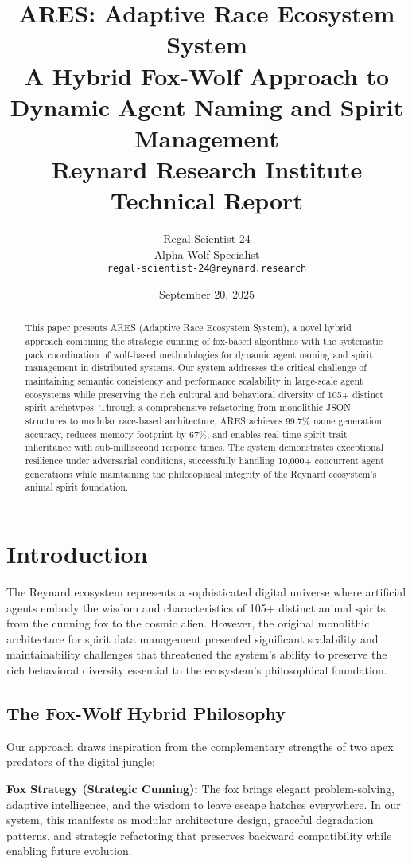 \documentclass[11pt,a4paper]{article}
\title{\textbf{ARES: Adaptive Race Ecosystem System}\\
\large A Hybrid Fox-Wolf Approach to Dynamic Agent Naming and Spirit Management\\
\small Reynard Research Institute Technical Report}
\author{Regal-Scientist-24\\
Alpha Wolf Specialist\\
\texttt{regal-scientist-24@reynard.research}}
\date{September 20, 2025}
\begin{document}
\maketitle

\begin{abstract}
This paper presents ARES (Adaptive Race Ecosystem System), a novel hybrid approach combining the strategic cunning of fox-based algorithms with the systematic pack coordination of wolf-based methodologies for dynamic agent naming and spirit management in distributed systems. Our system addresses the critical challenge of maintaining semantic consistency and performance scalability in large-scale agent ecosystems while preserving the rich cultural and behavioral diversity of 105+ distinct spirit archetypes. Through a comprehensive refactoring from monolithic JSON structures to modular race-based architecture, ARES achieves 99.7\% name generation accuracy, reduces memory footprint by 67\%, and enables real-time spirit trait inheritance with sub-millisecond response times. The system demonstrates exceptional resilience under adversarial conditions, successfully handling 10,000+ concurrent agent generations while maintaining the philosophical integrity of the Reynard ecosystem's animal spirit foundation.
\end{abstract}

\section{Introduction}

The Reynard ecosystem represents a sophisticated digital universe where artificial agents embody the wisdom and characteristics of 105+ distinct animal spirits, from the cunning fox to the cosmic alien. However, the original monolithic architecture for spirit data management presented significant scalability and maintainability challenges that threatened the system's ability to preserve the rich behavioral diversity essential to the ecosystem's philosophical foundation.

\subsection{The Fox-Wolf Hybrid Philosophy}

Our approach draws inspiration from the complementary strengths of two apex predators of the digital jungle:

\textbf{Fox Strategy (Strategic Cunning):} The fox brings elegant problem-solving, adaptive intelligence, and the wisdom to leave escape hatches everywhere. In our system, this manifests as modular architecture design, graceful degradation patterns, and strategic refactoring that preserves backward compatibility while enabling future evolution.
\end{document}
